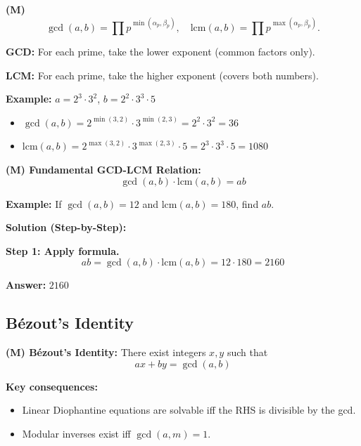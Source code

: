 \documentclass[12pt]{extarticle}
\begin{document}
\textbf{(M)}
\[
\gcd(a,b)=\prod p^{\min(\alpha_p,\beta_p)}, \quad
\mathrm{lcm}(a,b)=\prod p^{\max(\alpha_p,\beta_p)}.
\]

\begin{conceptbox}[Intuition]
\textbf{GCD:} For each prime, take the lower exponent (common factors only).

\textbf{LCM:} For each prime, take the higher exponent (covers both numbers).

\textbf{Example:} $a = 2^3 \cdot 3^2$, $b = 2^2 \cdot 3^3 \cdot 5$
\begin{itemize}
    \item $\gcd(a,b) = 2^{\min(3,2)} \cdot 3^{\min(2,3)} = 2^2 \cdot 3^2 = 36$
    \item $\mathrm{lcm}(a,b) = 2^{\max(3,2)} \cdot 3^{\max(2,3)} \cdot 5 = 2^3 \cdot 3^3 \cdot 5 = 1080$
\end{itemize}
\end{conceptbox}

\begin{theorembox}
\textbf{(M) Fundamental GCD-LCM Relation:}
\[
\gcd(a,b)\cdot\mathrm{lcm}(a,b)=ab
\]
\end{theorembox}

\begin{examplebox}
\textbf{Example:} If $\gcd(a,b) = 12$ and $\mathrm{lcm}(a,b) = 180$, find $ab$.

\textbf{Solution (Step-by-Step):}

\textbf{Step 1: Apply formula.}
\[
ab = \gcd(a,b) \cdot \mathrm{lcm}(a,b) = 12 \cdot 180 = 2160
\]

\textbf{Answer:} $\boxed{2160}$
\end{examplebox}

\subsection*{Bézout's Identity}

\begin{theorembox}
\textbf{(M) Bézout's Identity:} There exist integers $x,y$ such that
\[
ax+by=\gcd(a,b)
\]
\end{theorembox}

\begin{remarkbox}
\textbf{Key consequences:}
\begin{itemize}
\item Linear Diophantine equations are solvable iff the RHS is divisible by the gcd.
\item Modular inverses exist iff $\gcd(a,m)=1$.
\end{itemize}
\end{remarkbox}
\end{document}
